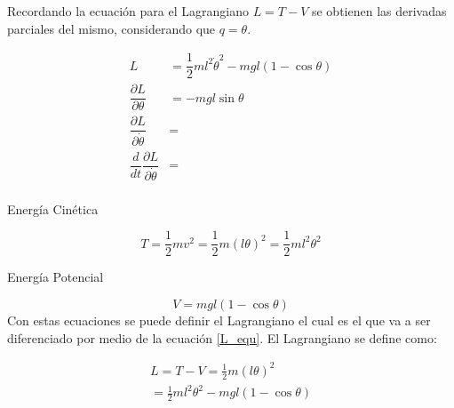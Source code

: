 Recordando la ecuación para el Lagrangiano $L = T - V$ se obtienen las 
derivadas parciales del mismo, considerando que $q = \theta$.

\begin{equation}
 \begin{split}
  L & = \dfrac{1}{2}m l^2 \dot{\theta}^2 - m g l (1 - \cos{\theta})\\
  \dfrac{\partial L}{\partial \theta} &= - m g l \sin{\theta} \\
  \dfrac{\partial L}{\partial \dot{\theta}} &=\\
  \dfrac{d}{dt}\dfrac{\partial L}{\partial \dot{\theta}} &=\\
 \end{split}
\end{equation}



\begin{flushleft}
{\large Energía Cinética}
\end{flushleft}
\begin{equation} \label{T_equ}
T = \frac{1}{2}mv^2 = \frac{1}{2}m(l\theta)^2 = \frac{1}{2}ml^2\theta^2 
\end{equation}
\begin{flushleft}
{\large Energía Potencial}
\end{flushleft}
\begin{equation} \label{V_equ}
V = mgl(1-\cos \theta)
\end{equation}
Con estas ecuaciones se puede definir el Lagrangiano el cual es el que va a ser diferenciado por medio de la ecuación \ref{L_equ}. El Lagrangiano se define como:

\begin{large}
\begin{align*}
L = T - V = \frac{1}{2}m(l\theta)^2 \\
= \frac{1}{2}ml^2\theta^2 - mgl(1-\cos \theta)
\end{align*}
\end{large}

